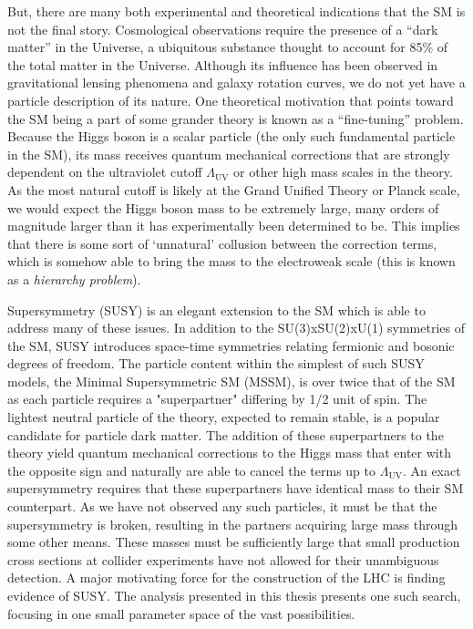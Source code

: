 But, there are many both experimental and theoretical indications that the SM is not the final story. Cosmological observations require the presence of a ``dark matter'' in the Universe, a ubiquitous substance thought to account for 85\% of the total matter in the Universe. Although its influence has been observed in gravitational lensing phenomena and galaxy rotation curves, we do not yet have a particle description of its nature. One theoretical motivation that points toward the SM being a part of some grander theory is known as a ``fine-tuning'' problem. Because the Higgs boson is a scalar particle (the only such fundamental particle in the SM), its mass receives quantum mechanical corrections that are strongly dependent on the ultraviolet cutoff $\Lambda_{\textrm{UV}}$ or other high mass scales in the theory. As the most natural cutoff is likely at the Grand Unified Theory or Planck scale, we would expect the Higgs boson mass to be extremely large, many orders of magnitude larger than it has experimentally been determined to be. This implies that there is some sort of `unnatural' collusion between the correction terms, which is somehow able to bring the mass to the electroweak scale (this is known as a \textit{hierarchy problem}).

Supersymmetry (SUSY) is an elegant extension to the SM which is able to address many of these issues. In addition to the SU(3)xSU(2)xU(1) symmetries of the SM, SUSY introduces space-time symmetries relating fermionic and bosonic degrees of freedom. The particle content within the simplest of such SUSY models, the Minimal Supersymmetric SM (MSSM), is over twice that of the SM as each particle requires a "superpartner" differing by 1/2 unit of spin. The lightest neutral particle of the theory, expected to remain stable, is a popular candidate for particle dark matter. The addition of these superpartners to the theory yield quantum mechanical corrections to the Higgs mass that enter with the opposite sign and naturally are able to cancel the terms up to $\Lambda_{\textrm{UV}}$. An exact supersymmetry requires that these superpartners have identical mass to their SM counterpart. As we have not observed any such particles, it must be that the supersymmetry is broken, resulting in the partners acquiring large mass through some other means. These masses must be sufficiently large that small production cross sections at collider experiments have not allowed for their unambiguous detection. A major motivating force for the construction of the LHC is finding evidence of SUSY. The analysis presented in this thesis presents one such search, focusing in one small parameter space of the vast possibilities.

